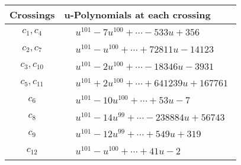 \documentclass[1p]{elsarticle_modified}
\theoremstyle{definition}
\begin{document}
\begin{tabular}{m{50pt}|m{274pt}}
Crossings & \hspace{64pt}u-Polynomials at each crossing \\
\hline $$\begin{aligned}c_{1},c_{4}\end{aligned}$$&$\begin{aligned}
&u^{101}-7 u^{100}+\cdots-533 u+356
\end{aligned}$\\
\hline $$\begin{aligned}c_{2},c_{7}\end{aligned}$$&$\begin{aligned}
&u^{101}- u^{100}+\cdots+72811 u-14123
\end{aligned}$\\
\hline $$\begin{aligned}c_{3},c_{10}\end{aligned}$$&$\begin{aligned}
&u^{101}-2 u^{100}+\cdots-18346 u-3931
\end{aligned}$\\
\hline $$\begin{aligned}c_{5},c_{11}\end{aligned}$$&$\begin{aligned}
&u^{101}+2 u^{100}+\cdots+641239 u+167761
\end{aligned}$\\
\hline $$\begin{aligned}c_{6}\end{aligned}$$&$\begin{aligned}
&u^{101}-10 u^{100}+\cdots+53 u-7
\end{aligned}$\\
\hline $$\begin{aligned}c_{8}\end{aligned}$$&$\begin{aligned}
&u^{101}-14 u^{99}+\cdots-238884 u+56743
\end{aligned}$\\
\hline $$\begin{aligned}c_{9}\end{aligned}$$&$\begin{aligned}
&u^{101}-12 u^{99}+\cdots+549 u+319
\end{aligned}$\\
\hline $$\begin{aligned}c_{12}\end{aligned}$$&$\begin{aligned}
&u^{101}- u^{100}+\cdots+41 u-2
\end{aligned}$\\
\hline
\end{tabular}\\~\\
\end{document}

